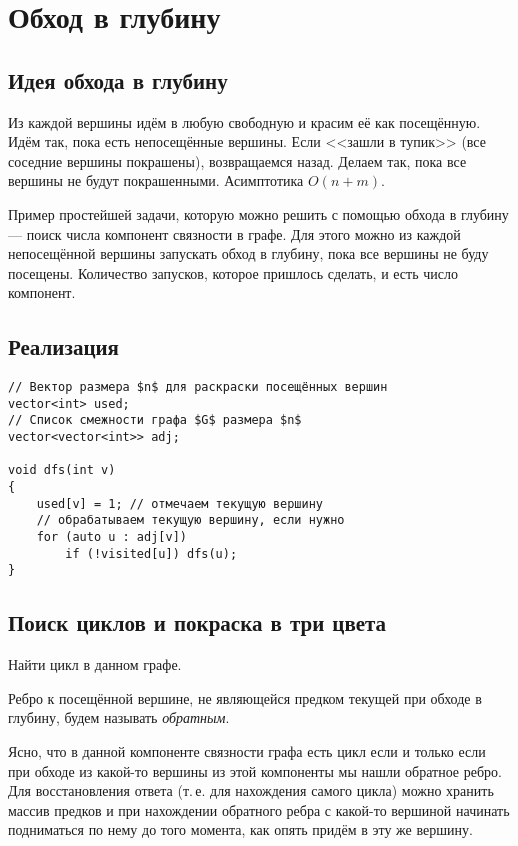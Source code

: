 \section{Обход в глубину}

\subsection{Идея обхода в глубину}

Из каждой вершины идём в любую свободную и красим её как посещённую. Идём так, пока есть непосещённые вершины. Если <<зашли в тупик>> (все соседние вершины покрашены), возвращаемся назад. Делаем так, пока все вершины не будут покрашенными. Асимптотика $O(n + m)$.

Пример простейшей задачи, которую можно решить с помощью обхода в глубину --- поиск числа компонент связности в графе. Для этого можно из каждой непосещённой вершины запускать обход в глубину, пока все вершины не буду посещены. Количество запусков, которое пришлось сделать, и есть число компонент.

\subsection{Реализация}

\begin{verbatim}
// Вектор размера $n$ для раскраски посещённых вершин
vector<int> used;
// Список смежности графа $G$ размера $n$
vector<vector<int>> adj;

void dfs(int v)
{
    used[v] = 1; // отмечаем текущую вершину
    // обрабатываем текущую вершину, если нужно
    for (auto u : adj[v])
        if (!visited[u]) dfs(u);
}
\end{verbatim}

\subsection{Поиск циклов и покраска в три цвета}

\begin{problem}
    Найти цикл в данном графе.
\end{problem}

Ребро к посещённой вершине, не являющейся предком текущей при обходе в глубину, будем называть \textit{обратным}.

Ясно, что в данной компоненте связности графа есть цикл если и только если при обходе из какой-то вершины из этой компоненты мы нашли обратное ребро. Для восстановления ответа (т.\,е. для нахождения самого цикла) можно хранить массив предков и при нахождении обратного ребра с какой-то вершиной начинать подниматься по нему до того момента, как опять придём в эту же вершину.


